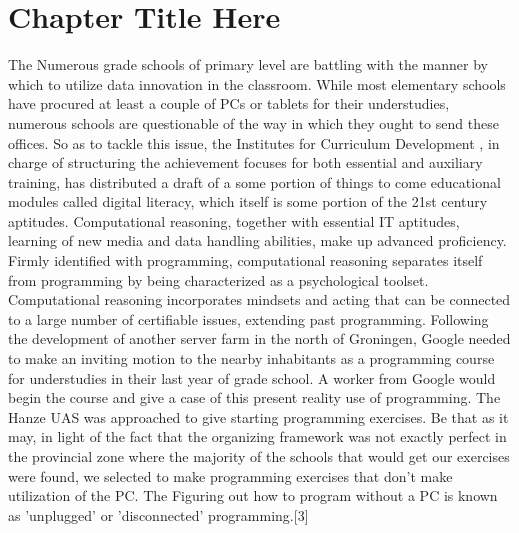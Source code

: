 
\chapter{Chapter Title Here}\label{chapter:firstchapter} %

\label{ChapterX} %

The Numerous grade schools of primary level are battling with the manner by which to utilize data innovation in the classroom. While most elementary schools have procured at least a couple of PCs or tablets for their understudies, numerous schools are questionable of the way in which they ought to send these offices. So as to tackle this issue, the Institutes for Curriculum Development , in charge of structuring the achievement focuses for both essential and auxiliary training, has distributed a draft of a some portion of things to come educational modules called digital literacy, which itself is some portion of the 21st century aptitudes. Computational reasoning, together with essential IT aptitudes, learning of new media and data handling abilities, make up advanced proficiency. Firmly identified with programming, computational reasoning separates itself from programming by being characterized as a psychological toolset. Computational reasoning incorporates mindsets and acting that can be connected to a large number of certifiable issues, extending past programming. Following the development of another server farm in the north of Groningen, Google needed to make an inviting motion to the nearby inhabitants as a programming course for understudies in their last year of grade school. A worker from Google would begin the course and give a case of this present reality use of programming. The Hanze UAS was approached to give starting programming exercises. Be that as it may, in light of the fact that the organizing framework was not exactly perfect in the provincial zone where the majority of the schools that would get our exercises were found, we selected to make programming exercises that don’t make utilization of the PC. The Figuring out how to program without a PC is known as ’unplugged’ or ’disconnected’ programming.[3]


